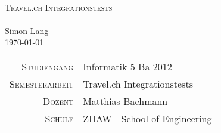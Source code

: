 




\begin{titlepage}
	\mbox{}\vspace{5\baselineskip}\\
	\rmfamily\huge
	\centering
	\textsc{Travel.ch Integrationstests} \\
	\mbox{}\vspace{1\baselineskip}\\
	Simon Lang\\
	\vspace{2\baselineskip}
	\rmfamily\Large
	\today\\
	\mbox{}
	
	\vfill

	\begin{center}
		\begin{tabular}[h]{ r l }
			\textsc{\small{Studiengang}} & Informatik 5 Ba 2012\\
			\textsc{\small{Semesterarbeit}} & Travel.ch Integrationstests\\
			\textsc{\small{Dozent}} &  Matthias Bachmann\\
			\textsc{\small{Schule}} & ZHAW - School of Engineering\\
		\end{tabular}
	\end{center}

\end{titlepage}




% 
